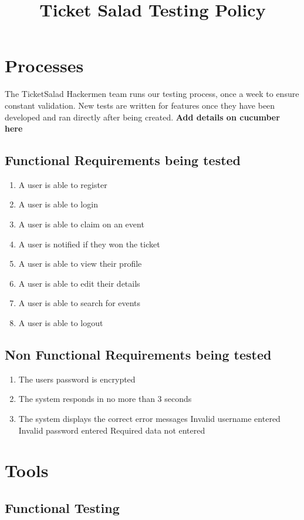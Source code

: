 \documentclass[11pt]{article}
\begin{document}
	\title{Ticket Salad Testing Policy}
	\date{}
	\maketitle
	\newpage
	\tableofcontents
	\newpage
	\section{Processes}
	The TicketSalad Hackermen team runs our testing process, once a week to ensure constant validation. New tests are written for features once they have been developed and ran directly after being created. 
	\newline \textbf{Add details on cucumber here}
	\subsection{Functional Requirements being tested}
	\begin{enumerate}
		\item A user is able to register
		\item A user is able to login
		\item A user is able to claim on an event
		\item A user is notified if they won the ticket
		\item A user is able to view their profile
		\item A user is able to edit their details
		\item A user is able to search for events
		\item A user is able to logout
	\end{enumerate}
	\subsection{Non Functional Requirements being tested}
	\begin{enumerate}
		\item The users password is encrypted
		\item The system responds in no more than 3 seconds
		\item The system displays the correct error messages
		\subitem Invalid username entered
		\subitem Invalid password entered
		\subitem Required data not entered
	\end{enumerate}
	\section{Tools}
		\subsection{Functional Testing}
\end{document}
